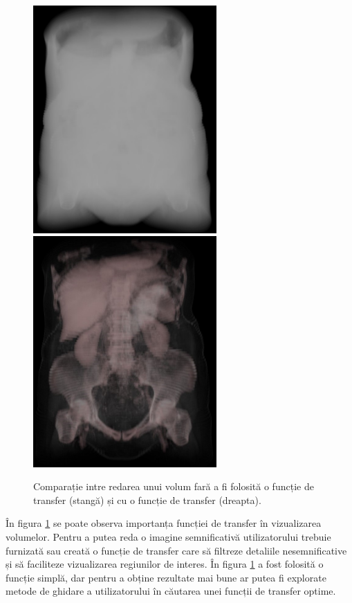 \begin{figure}[!h]
    \centering
    \includegraphics[width=7cm]{images/vol_wo_tf.jpg}
    \includegraphics[width=7cm]{images/vol_w_tf.jpg}
    \\
    \caption{Comparație intre redarea unui volum fară a fi folosită o funcție de transfer (stangă) și cu o funcție de transfer (dreapta).}
    \label{fig:comp_tf}
\end{figure}

În figura \ref{fig:comp_tf} se poate observa importanța funcției de transfer în vizualizarea volumelor. Pentru a putea reda o imagine semnificativă utilizatorului trebuie furnizată sau creată o funcție de transfer care să filtreze detaliile nesemnificative și să faciliteze vizualizarea regiunilor de interes. În figura \ref{fig:comp_tf} a fost folosită o funcție simplă, dar pentru a obține rezultate mai bune ar putea fi explorate metode de ghidare a utilizatorului în căutarea unei funcții de transfer  optime\cite{Zhou2009AutomaticTF}.

